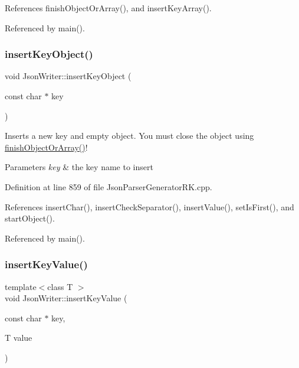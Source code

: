 References finish\+Object\+Or\+Array(), and insert\+Key\+Array().



Referenced by main().

\mbox{\label{class_json_writer_a338c3e07d0a6a2334da66684c8ae02a3}} 
\subsubsection{\texorpdfstring{insert\+Key\+Object()}{insertKeyObject()}}
{\footnotesize\ttfamily void Json\+Writer\+::insert\+Key\+Object (\begin{DoxyParamCaption}\item[{const char $\ast$}]{key }\end{DoxyParamCaption})}



Inserts a new key and empty object. You must close the object using \hyperlink{class_json_writer_adbd96b46b0679bea3a066c0e62bd86b0}{finish\+Object\+Or\+Array()}! 


\begin{DoxyParams}{Parameters}
{\em key} & the key name to insert \\
\hline
\end{DoxyParams}


Definition at line 859 of file Json\+Parser\+Generator\+R\+K.\+cpp.



References insert\+Char(), insert\+Check\+Separator(), insert\+Value(), set\+Is\+First(), and start\+Object().



Referenced by main().

\mbox{\label{class_json_writer_ac2de627389b59ce2c8ed95e10ea213bf}} 
\subsubsection{\texorpdfstring{insert\+Key\+Value()}{insertKeyValue()}}
{\footnotesize\ttfamily template$<$class T $>$ \\
void Json\+Writer\+::insert\+Key\+Value (\begin{DoxyParamCaption}\item[{const char $\ast$}]{key,  }\item[{T}]{value }\end{DoxyParamCaption})\hspace{0.3cm}{\ttfamily [inline]}}




